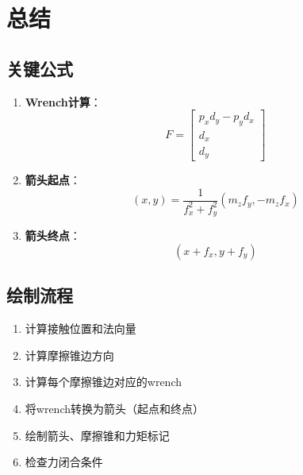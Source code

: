 \documentclass[12pt,a4paper]{article}
\begin{document}
\section{总结}

\subsection{关键公式}

\begin{enumerate}
\item \textbf{Wrench计算}：
   \begin{equation}
   F = \begin{bmatrix} p_x d_y - p_y d_x \\ d_x \\ d_y \end{bmatrix}
   \end{equation}

\item \textbf{箭头起点}：
   \begin{equation}
   (x, y) = \frac{1}{f_x^2 + f_y^2} (m_z f_y, -m_z f_x)
   \end{equation}

\item \textbf{箭头终点}：
   \begin{equation}
   (x + f_x, y + f_y)
   \end{equation}
\end{enumerate}

\subsection{绘制流程}

\begin{enumerate}
\item 计算接触位置和法向量
\item 计算摩擦锥边方向
\item 计算每个摩擦锥边对应的wrench
\item 将wrench转换为箭头（起点和终点）
\item 绘制箭头、摩擦锥和力矩标记
\item 检查力闭合条件
\end{enumerate}
\end{document}
